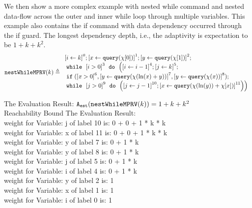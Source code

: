             \begin{example}
   \label{ex:nestedWhileMPRV}
   We then show a more complex example with nested while command and nested data-flow across the outer and inner while loop through multiple variables.
   This example also contains the if command with data dependency occurred through the if guard.
   The longest dependency depth, i.e., the adaptivity is expectation to be $1 + k + k^2 $.
   \[
   \kw{nestWhileMPRV}(k) \triangleq 
   \begin{array}{l}
\clabel{\assign{i}{k} }^{0} ; 
\clabel{ \assign{x}{\query(\chi[0])}}^{1} ; 
\clabel{ \assign{y}{\query(\chi[1])}}^{2} ; \\
    \ewhile ~ \clabel{i > 0}^{3} ~ \edo ~ 
    \Big(
     \clabel{\assign{i}{i-1}}^{4} ;
     \clabel{\assign{j}{k}}^{5} ;\\
     \eif(\clabel{x > 0}^6, \clabel{\assign{y}{\query(\chi(\ln(x) + y))} }^{7},
     \clabel{\assign{y}{\query(\chi(x))} }^{8} )
      ; \\
     \ewhile ~ \clabel{j > 0}^{9} ~ \edo ~ 
     \Big(
      \clabel{\assign{j}{j-1}}^{10};
      \clabel{\assign{x}{\query(\chi(\ln(y))+\chi[x])} }^{11}
      \Big) \Big)
\end{array}
   \]
   \end{example}
   The Evaluation Result: $ {\mathtt{A_{est}}}(\mathtt{nestWhileMPRV}(k)) = 1 + k + k^2$
   \\
   Reachability Bound The Evaluation Result: \\
            weight for Variable: j of label 10 is: 0 + 0 + 1 * k * k \\
   weight for Variable: x of label 11 is: 0 + 0 + 1 * k * k \\
   weight for Variable: y of label 7 is: 0 + 1 * k \\
   weight for Variable: y of label 8 is: 0 + 1 * k \\
   weight for Variable: j of label 5 is: 0 + 1 * k \\
   weight for Variable: i of label 4 is: 0 + 1 * k \\
   weight for Variable: y of label 2 is: 1 \\
   weight for Variable: x of label 1 is: 1 \\
   weight for Variable: i of label 0 is: 1 \\